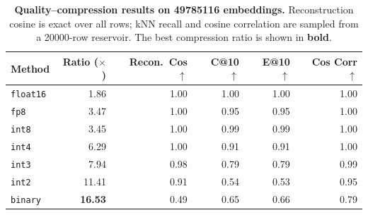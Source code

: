 \documentclass{article}
\begin{document}
\begin{table}[t]
  \centering
  \caption{\textbf{Quality--compression results on \num{49785116} embeddings.}
    Reconstruction cosine is exact over all rows; kNN recall and cosine correlation are sampled from a \num{20000}-row reservoir.
  The best compression ratio is shown in \textbf{bold}.}
  \label{tab:quality}
  \begin{tabular}{lrrrrr}
    \toprule
    Method           & Ratio ($\times$) & Recon.\ Cos $\uparrow$ & C@10 $\uparrow$ & E@10 $\uparrow$ & Cos Corr $\uparrow$ \\
    \midrule
    \texttt{float16} & 1.86             & 1.00                   & 1.00            & 1.00            & 1.00                \\
    \texttt{fp8}     & 3.47             & 1.00                   & 0.95            & 0.95            & 1.00                \\
    \texttt{int8}    & 3.45             & 1.00                   & 0.99            & 0.99            & 1.00                \\
    \texttt{int4}    & 6.29             & 1.00                   & 0.91            & 0.91            & 1.00                \\
    \texttt{int3}    & 7.94             & 0.98                   & 0.79            & 0.79            & 0.99                \\
    \texttt{int2}    & 11.41            & 0.91                   & 0.54            & 0.53            & 0.95                \\
    \texttt{binary}  & \textbf{16.53}   & 0.49                   & 0.65            & 0.66            & 0.79                \\
    \bottomrule
  \end{tabular}
\end{table}
\end{document}
